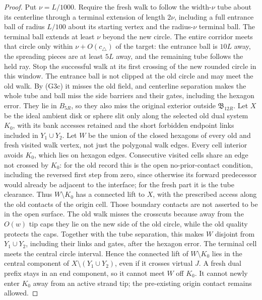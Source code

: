 \begin{proof}
Put \(\nu=L/1000\).  Require the fresh walk to follow the width-\(\nu\)
tube about its centerline through a terminal extension of length \(2\nu\),
including a full entrance ball of radius \(L/100\) about its starting
vertex and the radius-\(\nu\) terminal ball.  The terminal ball extends
at least \(\nu\) beyond the new circle.  The entire corridor meets that
circle only within \(\nu+O(c_\triangle)\) of the target: the entrance ball
is \(10L\) away, the spreading pieces are at least \(5L\) away, and the
remaining tube follows the held ray.  Stop the successful walk at its first
crossing of the new rounded circle in this window.  The
entrance ball is not clipped at the old circle and may meet the old walk.
By (G3c) it misses the old field, and centerline separation makes the
whole tube and ball miss the side barriers and their gates, including the
hexagon error.  They lie in \(B_{5R}\), so they also miss the original
exterior outside \(\mathfrak B_{12R}\).  Let \(X\) be the ideal ambient
disk or sphere slit only along the selected old dual system \(K_0\), with
its bank accesses retained and the short forbidden endpoint links included
in \(Y_1\cup Y_2\).  Let \(W\) be the union of the closed hexagons of
every old and fresh visited walk vertex, not just the polygonal walk edges.
Every cell interior avoids \(K_0\), which lies on hexagon edges.
Consecutive visited cells share an edge not crossed by \(K_0\): for the
old record this is the open no-prior-contact condition, including the
reversed first step from zero, since otherwise its forward predecessor
would already be adjacent to the interface; for the fresh part it is the
tube clearance.  Thus \(W\setminus K_0\) has a connected lift to \(X\),
with the prescribed access along the old contacts of the origin cell.
Those boundary contacts are not asserted to be in the open surface.
The old walk misses the crosscuts because away from the \(O(w)\) tip caps
they lie on the new side of the old circle, while the old quality protects
the caps.  Together with the tube separation, this makes \(W\) disjoint
from \(Y_1\cup Y_2\), including their links and gates, after the hexagon
error.  The terminal cell meets the central circle interval.  Hence the
connected lift of \(W\setminus K_0\) lies in the central component of
\(X\setminus(Y_1\cup Y_2)\), even if it crosses virtual \(J\).  A fresh
dual prefix stays in an end component, so it cannot meet \(W\) off
\(K_0\).  It cannot newly enter \(K_0\) away from an active strand tip; the
pre-existing origin contact remains allowed.


\end{proof}
